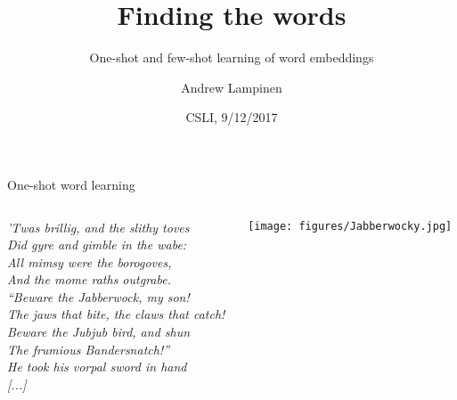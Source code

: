 \documentclass{beamer}
\begin{document}
\title{Finding the words}
\subtitle{One-shot and few-shot learning of word embeddings}
\author{Andrew Lampinen}
\date{CSLI, 9/12/2017}
\frame{\titlepage}

\begin{frame}{One-shot word learning}
\begin{columns}
\begin{column}{0.5\textwidth}
\textit{’Twas brillig, and the slithy toves}\\
\textit{Did gyre and gimble in the wabe:}\\ 
\textit{All mimsy were the borogoves,}\\
\textit{And the mome raths outgrabe.}\\[10pt]

\textit{“Beware the Jabberwock, my son! }\\
\textit{The jaws that bite, the claws that catch!}\\
\textit{Beware the Jubjub bird, and shun}\\ 
\textit{The frumious Bandersnatch!” }\\[10pt]

\textit{He took his vorpal sword in hand}\\
\textit{[...]}
\end{column}
\begin{column}{0.5\textwidth}
\centering
\texttt{[image: figures/Jabberwocky.jpg]}
\end{column}
\end{columns}
\end{frame}
\end{document}
